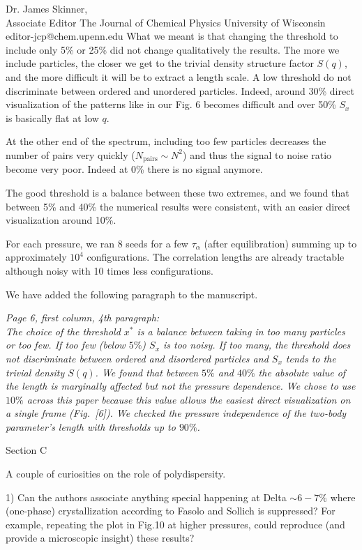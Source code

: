 \documentclass[a4paper, rebuttal, parskip=true, firsthead=false, fromemail=false, foldmarks=false]{scrlttr2}
\begin{document}
\begin{letter}{Dr. James Skinner,\\Associate Editor
The Journal of Chemical Physics
University of Wisconsin\\
editor-jcp@chem.upenn.edu }
What we meant is that changing the threshold to include only 5\% or 25\% did not change qualitatively the results. The more we include particles, the closer we get to the trivial density structure factor $S(q)$, and the more difficult it will be to extract a length scale. A low threshold do not discriminate between ordered and unordered particles. Indeed, around 30\% direct visualization of the patterns like in our Fig. 6 becomes difficult and over 50\% $S_x$ is basically flat at low $q$. 

At the other end of the spectrum, including too few particles decreases the number of pairs very quickly ($N_\text{pairs}\sim N^2$) and thus the signal to noise ratio become very poor. Indeed at 0\% there is no signal anymore.

The good threshold is a balance between these two extremes, and we found that between 5\% and 40\% the numerical results were consistent, with an easier direct visualization around 10\%.

For each pressure, we ran 8 seeds for a few $\tau_\alpha$ (after equilibration) summing up to approximately $10^4$ configurations. The correlation lengths are already tractable although noisy with 10 times less configurations.

We have added the following paragraph to the manuscript.

{\it Page 6, first column, 4th paragraph:\\
The choice of the threshold $x^*$ is a balance between taking in too many particles or too few. If too few (below $5\%$) $S_x$ is too noisy. If too many, the threshold does not discriminate between ordered and disordered particles and $S_x$ tends to the trivial density $S(q)$. We found that between $5\%$ and $40\%$ the absolute value of the length is marginally affected but not the pressure dependence. We chose to use $10\%$ across this paper because this value allows the easiest direct visualization on a single frame (Fig.~[6]). We checked the pressure independence of the two-body parameter's length with thresholds up to $90\%$.
} 

\begin{quotationi}
Section C

A couple of curiosities on the role of polydispersity.

1) Can the authors associate anything special happening at Delta $\sim6-7\%$ where (one-phase) crystallization according to Fasolo and Sollich is suppressed? For example, repeating the plot in Fig.10 at higher pressures, could reproduce (and provide a microscopic insight) these results?
\end{quotationi}


\end{letter}
\end{document}
